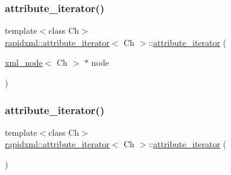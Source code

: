 \subsubsection{\texorpdfstring{attribute\+\_\+iterator()}{attribute\_iterator()}\hspace{0.1cm}{\footnotesize\ttfamily [2/4]}}
{\footnotesize\ttfamily template$<$class Ch$>$ \\
\mbox{\hyperlink{classrapidxml_1_1attribute__iterator}{rapidxml\+::attribute\+\_\+iterator}}$<$ Ch $>$\+::\mbox{\hyperlink{classrapidxml_1_1attribute__iterator}{attribute\+\_\+iterator}} (\begin{DoxyParamCaption}\item[{\mbox{\hyperlink{classrapidxml_1_1xml__node}{xml\+\_\+node}}$<$ Ch $>$ $\ast$}]{node }\end{DoxyParamCaption})\hspace{0.3cm}{\ttfamily [inline]}}

\mbox{\label{classrapidxml_1_1attribute__iterator_a30a82132793bc59d4e7b20f5be6237b9}} 
\subsubsection{\texorpdfstring{attribute\+\_\+iterator()}{attribute\_iterator()}\hspace{0.1cm}{\footnotesize\ttfamily [3/4]}}
{\footnotesize\ttfamily template$<$class Ch$>$ \\
\mbox{\hyperlink{classrapidxml_1_1attribute__iterator}{rapidxml\+::attribute\+\_\+iterator}}$<$ Ch $>$\+::\mbox{\hyperlink{classrapidxml_1_1attribute__iterator}{attribute\+\_\+iterator}} (\begin{DoxyParamCaption}{ }\end{DoxyParamCaption})\hspace{0.3cm}{\ttfamily [inline]}}

\mbox{\label{classrapidxml_1_1attribute__iterator_a1109344dead88533ae4dd68cea5d9613}} 
